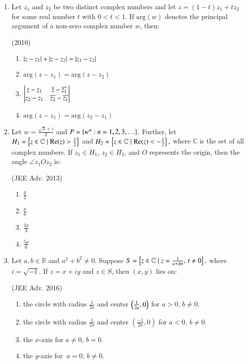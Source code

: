 \documentclass[journal,12pt,twocolumn]{IEEEtran}
\theoremstyle{remark}
\begin{document}
\begin{enumerate}
    \item Let $ z_1 $ and $ z_2 $ be two distinct complex numbers and let $ z = (1 - t) z_1 + t z_2 $ for some real number $ t $ with $ 0 < t < 1 $. If $ \mathrm{arg}(w) $ denotes the principal argument of a non-zero complex number $ w $, then:

\hfill (2010)

\begin{enumerate}[label=(\alph*)]
    \item $ \left\vert z - z_1\right\vert + \left\vert z - z_2\right\vert = \left\vert z_1 - z_2\right\vert $
    \item $ \mathrm{arg}(z - z_1) = \mathrm{arg}(z - z_2) $
    \item $
    \begin{vmatrix}
    z - z_1 & \overline{z} - \overline{z_1} \\
    z_2 - z_1 & \overline{z_2} - \overline{z_1}
    \end{vmatrix}
    $
    \item $\mathrm{arg}(z - z_1) = \mathrm{arg}(z_2 - z_1)$
\end{enumerate}

   \item Let $ w = \frac{\sqrt{3} + i}{2} $ and $ P = \left\{w^n : n = 1, 2, 3, \ldots \right\} $. Further, let 
$
H_1 = \left\{ z \in \mathbb{C} \mid \text{Re}(z) > \frac{1}{2} \right\}
$
and
$
H_2 = \left\{ z \in \mathbb{C} \mid \text{Re}(z) < -\frac{1}{2} \right\},
$
where $ \mathbb{C} $ is the set of all complex numbers. If $ z_1 \in H_1 $, $ z_2 \in H_2 $, and $ O $ represents the origin, then the angle $ \angle z_1Oz_2 $ is:

\hfill (JEE Adv. 2013)

\begin{multicols}{4}
    \begin{enumerate}[label=(\alph*)]
    \item $ \frac{p}{2} $
    \item $ \frac{p}{6} $
    \item $ \frac{2p}{3} $
    \item $ \frac{5p}{6} $
    \end{enumerate}
\end{multicols}

    \item Let $ a, b \in \mathbb{R} $ and $ a^2 + b^2 \ne 0 $. Suppose
    $
    S = \left\{ z \in \mathbb{C} \mid z = \frac{1}{a + ibt}, \, t \ne 0 \right\},
    $
    where $ i = \sqrt{-1} $. If $ z = x + iy $ and $ z \in S $, then $(x, y)$ lies on:

    \hfill (JEE Adv. 2016)

    \begin{enumerate}[label=(\alph*)]
    \item the circle with radius $ \frac{1}{2a} $ and center $\left(\frac{1}{2a}, 0\right)$ for $ a > 0 $, $ b \ne 0 $.
    \item the circle with radius $ \frac{1}{2a} $ and center $\left(\frac{-1}{2a}, 0\right)$ for $ a < 0 $, $ b \ne 0 $.
    \item the $ x $-axis for $ a \ne 0 $, $ b = 0 $.
    \item the $ y $-axis for $\ a = 0 $, $ b \ne 0 $.
    \end{enumerate}


\end{enumerate}
\end{document}

